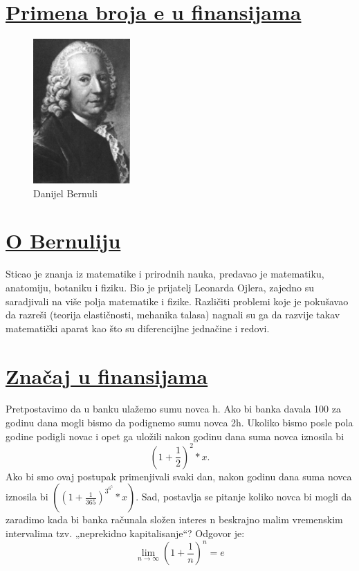 \documentclass{article}
\begin{document}
\section*{\uline{Primena broja e u finansijama}}
\begin{figure}
  \begin{center}
    \includegraphics[width=0.33\textwidth]{bernuli.jpg}
  \end{center}
  \caption{Danijel Bernuli}
\end{figure}
\paragraph{}
\section*{\uline{O Bernuliju}}
Sticao je znanja iz matematike i prirodnih nauka, predavao je matematiku, anatomiju, botaniku i fiziku. Bio je prijatelj Leonarda Ojlera, zajedno su saradjivali na više polja matematike i fizike. Različiti problemi koje je pokušavao da razreši (teorija elastičnosti, mehanika talasa) nagnali su ga da razvije takav matematički aparat kao što su diferencijlne jednačine i redovi.
\section*{\uline{Značaj u finansijama}}
Pretpostavimo da u banku ulažemo sumu novca h. Ako bi banka davala 100%
za godinu dana mogli bismo da podignemo sumu novca 2h. Ukoliko bismo posle pola
godine podigli novac i opet ga uložili nakon godinu dana suma novca iznosila bi
\begin{equation} (1+\frac{1}{2})^2*x. \end{equation}
Ako bi smo ovaj postupak primenjivali svaki dan, nakon godinu dana suma novca
iznosila bi $((1+\frac{1}{365})^3^6^5*x)$. Sad, postavlja se pitanje koliko novca bi mogli da zaradimo kada bi banka računala složen interes n beskrajno malim vremenskim intervalima tzv. „neprekidno kapitalisanje“? Odgovor je:
\begin{equation} \lim_{n \rightarrow \infty} (1+\frac{1}{n})^n=e \end{equation}
\newpage{}
\end{document}
